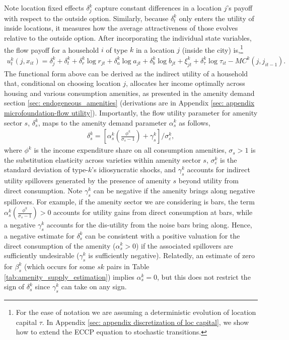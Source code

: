 \documentclass[11pt]{article}
\begin{document}
 Note location fixed effects $\delta^k_j$ capture constant differences in a location $j$'s payoff with respect to the outside option. Similarly, because $\delta^k_t$ only enters the utility of inside locations, it measures how the average attractiveness of those evolves relative to the outside option. After incorporating the individual state variables, the flow payoff for a household $i$ of type $k$ in a location $j$ (inside the city) is,\footnote{For the ease of notation we are assuming a deterministic evolution of location capital $\tau$. In Appendix \ref{sec: appendix discretization of loc capital}, we show how to extend the ECCP equation to stochastic transitions.}
\begin{align*}
 u^k_t(j, x_{it}) = \delta_{j}^k + \delta^k_t + \delta_{r}^k \log r_{{j}t} + \delta_{a}^k \log a_{jt} + \delta_b^k \log b_{jt} + \xi_{{j}t}^k + \delta_{\tau}^k \log \tau_{it} - MC^k(j,j_{it-1}). 
\end{align*}
The functional form above can be derived as the indirect utility of a household that, conditional on choosing location $j$, allocates her income optimally across housing and various consumption amenities, as presented in the amenity demand  section \ref{sec: endogeneous_amenities} (derivations are in Appendix \ref{sec: appendix microfoundation-flow utility}). Importantly, the flow utility parameter for amenity sector $s$, $\delta_s^k$, maps to the amenity demand parameter $\alpha_s^k$ as follows,
\begin{align}\label{eq: delta alpha connection}
    \delta^k_s =  \left[\alpha^k_{s} \left(\frac{\phi^k}{\sigma_s-1}\right)  + \gamma^k_s\right]/\sigma^k_{\varepsilon},
\end{align}
where $\phi^k$ is the income expenditure share on all consumption amenities, $\sigma_s>1$ is the substitution elasticity across varieties within amenity sector $s$, $\sigma^k_{\varepsilon}$ is the standard deviation of type-$k$'s idiosyncratic shocks, and $\gamma^k_s$ accounts for indirect utility spillovers generated by the presence of amenity $s$ beyond utility from direct consumption. Note $\gamma^k_s$ can be negative if the amenity brings along negative spillovers. For example, if the amenity sector we are considering is bars, the term $\alpha^k_{s} \left(\frac{\phi^k}{\sigma_s-1}\right) >0$ accounts for utility gains from direct consumption at bars, while a negative $\gamma^k_s$ accounts for the dis-utility from the noise bars bring along. Hence, a negative estimate for $\delta^k_s$ can be consistent with a positive valuation for the direct consumption of the amenity ($\alpha^k_{s}>0$) if the associated spillovers are sufficiently undesirable ($\gamma^k_s$ is sufficiently negative). Relatedly, an estimate of zero for $\beta^k_{s}$ (which occurs for some $sk$ pairs in Table \ref{tab:amenity_supply_estimation}) implies $\alpha^k_{s}=0$, but this does not restrict the sign of $\delta^k_s$ since $\gamma^k_s$ can take on any sign.
\end{document}
